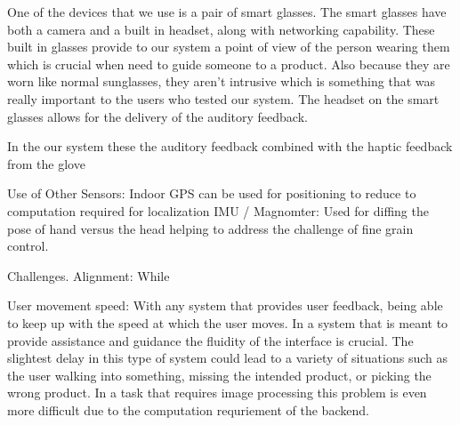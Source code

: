 One of the devices that we use is a pair of smart glasses. The smart glasses have both a camera and a built in headset, along with networking capability. These built in glasses provide to our system a point of view of the person wearing them which is crucial when need to guide someone to a product. Also because they are worn like normal sunglasses, they aren't intrusive which is something that was really important to the users who tested our system. The headset on the smart glasses allows for the delivery of the auditory feedback.

In the our system these the auditory feedback combined with the haptic feedback from the glove




Use of Other Sensors:
    Indoor GPS
        can be used for positioning to reduce to computation required for localization
    IMU / Magnomter:
        Used for diffing the pose of hand versus the head helping to address the challenge of fine grain control.


Challenges.
    Alignment:
        While 

    User movement speed:
        With any system that provides user feedback, being able to keep up with the speed at which the user moves. In a system that is meant to provide assistance and guidance the fluidity of the interface is crucial. The slightest delay in this type of system could lead to a variety of situations such as the user walking into something, missing the intended product, or picking the wrong product. In a task that requires image processing this problem is even more difficult due to the computation requriement of the backend.



